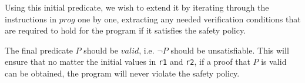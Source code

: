Using this initial predicate, we wish to extend it by iterating through the instructions in $prog$ one by one, extracting any needed verification conditions that are required to hold for the program if it satisfies the safety policy.

The final predicate $P$ should be $valid$, i.e. $\neg P$ should be unsatisfiable.
This will ensure that no matter the initial values in \texttt{r1} and \texttt{r2}, if a proof that $P$ is valid can be obtained, the program will never violate the safety policy.

















  







